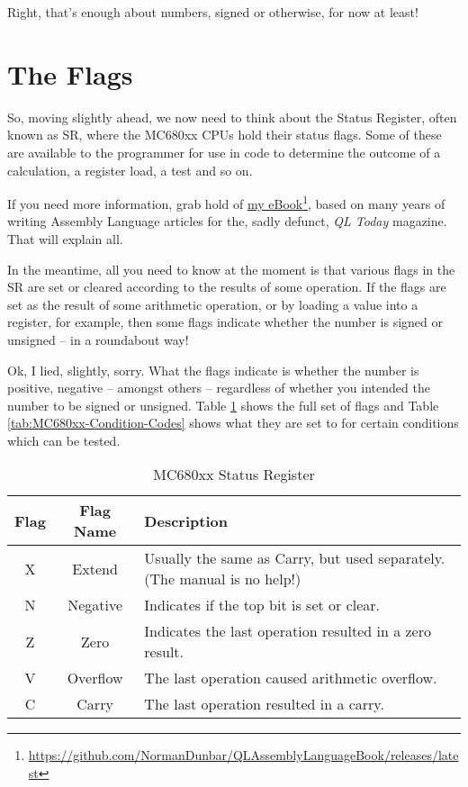 Right, that's enough about numbers, signed or otherwise, for now at
least!

\section{The Flags}

So, moving slightly ahead, we now need to think about the Status Register,
often known as SR, where the MC680xx CPUs hold their status flags.
Some of these are available to the programmer for use in code to determine
the outcome of a calculation, a register load, a test and so on.

If you need more information, grab hold of \href{https://github.com/NormanDunbar/QLAssemblyLanguageBook/releases/latest}{my eBook}\footnote{\url{https://github.com/NormanDunbar/QLAssemblyLanguageBook/releases/latest}},
based on many years of writing Assembly Language articles for the,
sadly defunct, \emph{QL Today} magazine. That will explain all.

In the meantime, all you need to know at the moment is that various
flags in the SR are set or cleared according to the results of some
operation. If the flags are set as the result of some arithmetic operation,
or by loading a value into a register, for example, then some flags
indicate whether the number is signed or unsigned -- in a roundabout
way!

Ok, I lied, slightly, sorry. What the flags indicate is whether the
number is positive, negative -- amongst others -- regardless of
whether you intended the number to be signed or unsigned. Table \ref{tab:MC680xx-Status-Register}
shows the full set of flags and Table \ref{tab:MC680xx-Condition-Codes}
shows what they are set to for certain conditions which can be tested.

\begin{table}[!h]
\begin{centering}
\begin{tabular}{|c|c|>{\centering}p{}|}
\hline 
\textbf{Flag} & \textbf{Flag Name} & \textbf{Description}\tabularnewline
\hline 
\hline 
X & Extend & Usually the same as Carry, but used separately. (The manual is no
help!)\tabularnewline
\hline 
N & Negative & Indicates if the top bit is set or clear.\tabularnewline
\hline 
Z & Zero & Indicates the last operation resulted in a zero result.\tabularnewline
\hline 
V & Overflow & The last operation caused arithmetic overflow.\tabularnewline
\hline 
C & Carry & The last operation resulted in a carry.\tabularnewline
\hline 
\end{tabular}
\par\end{centering}
\caption{MC680xx Status Register\label{tab:MC680xx-Status-Register}}
\end{table}


